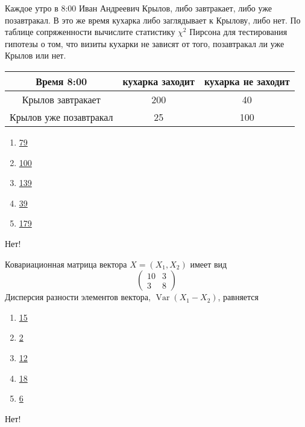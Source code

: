 \documentclass[t]{beamer}
\DeclareMathOperator{\Var}{Var}
\begin{document}
 \begin{frame} \label{47-No} 
\begin{block}{47} 

Каждое утро в 8:00 Иван Андреевич Крылов, либо завтракает, либо уже позавтракал. В это же время кухарка либо заглядывает к Крылову, либо нет. По таблице сопряженности вычислите  статистику $\chi^2$ Пирсона для тестирования гипотезы о том, что визиты кухарки не зависят от того, позавтракал ли уже Крылов или нет.
\begin{tabular}{c|cc}
Время 8:00 & кухарка заходит & кухарка не заходит \\
\hline
Крылов завтракает & 200 & 40 \\
Крылов уже позавтракал & 25 & 100 \\
\end{tabular}
 


 \end{block} 
\begin{enumerate} 
\item[] \hyperlink{47-No}{\beamergotobutton{} 79}
\item[] \hyperlink{47-No}{\beamergotobutton{} 100}
\item[] \hyperlink{47-Yes}{\beamergotobutton{} 139}
\item[] \hyperlink{47-No}{\beamergotobutton{} 39}
\item[] \hyperlink{47-No}{\beamergotobutton{} 179}
\end{enumerate} 

 \alert{Нет!} 
\end{frame} 


 \begin{frame} \label{48-No} 
\begin{block}{48} 

Ковариационная матрица вектора $X=(X_1,X_2)$ имеет вид
\[
\begin{pmatrix}
10 & 3 \\
3 & 8
\end{pmatrix}
\]
Дисперсия разности элементов вектора, $\Var(X_1-X_2)$, равняется
 


 \end{block} 
\begin{enumerate} 
\item[] \hyperlink{48-No}{\beamergotobutton{} 15}
\item[] \hyperlink{48-No}{\beamergotobutton{} 2}
\item[] \hyperlink{48-Yes}{\beamergotobutton{} 12}
\item[] \hyperlink{48-No}{\beamergotobutton{} 18}
\item[] \hyperlink{48-No}{\beamergotobutton{} 6}
\end{enumerate} 

 \alert{Нет!} 
\end{frame} 
\end{document}
